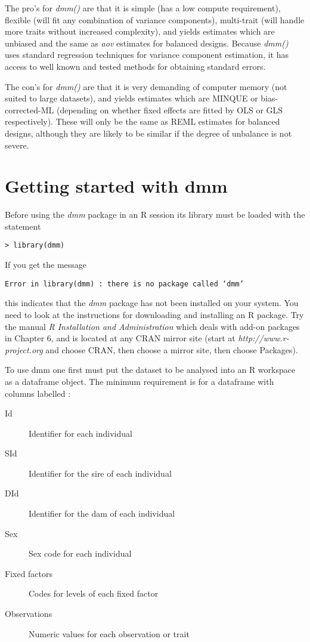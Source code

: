 \documentclass[titlepage]{article}  %
\begin{document}
The pro's for {\em dmm()} are that it is simple (has a low compute requirement), flexible (will fit any combination of variance components), multi-trait (will handle more traits without increased complexity), and yields estimates which are unbiased and the same as {\em aov} estimates for balanced designs.  Because {\em dmm()} uses standard regression techniques for variance component estimation, it has access to well known and tested methods for obtaining standard errors.

The con's for {\em dmm()} are that it is very demanding of computer memory (not suited to large datasets), and yields estimates which are MINQUE or bias-corrected-ML (depending on whether fixed effects are fitted by OLS or GLS respectively). These will only be the same as REML estimates for balanced designs, although they are likely to be similar if the degree of unbalance is not  severe.
 
\clearpage
\section{Getting started with dmm}
 Before using the {\em dmm} package in an R session its library must be loaded with the statement

\begin{verbatim}
> library(dmm)
\end{verbatim}

If you get the message
\begin{verbatim}
Error in library(dmm) : there is no package called ‘dmm’
\end{verbatim}

this indicates that the {\em dmm} package has not been installed on your system. You need to look at the instructions for downloading and installing an R package.  Try the manual {\em R Installation and Administration} which deals with add-on packages in Chapter 6, and is located at any CRAN mirror site (start at {\em http://www.r-project.org} and choose CRAN, then choose a mirror site, then choose Packages).

 To use dmm one first must put the dataset to be analysed into an R workspace as a dataframe object. The minimum requirement is for a dataframe with columns labelled :
\begin{description}
\item[Id] Identifier for each individual
\item[SId] Identifier for the sire of each individual
\item[DId] Identifier for the dam of each individual
\item[Sex] Sex code for each individual
\item[Fixed factors] Codes for levels of each fixed factor
\item[Observations] Numeric values for each observation or trait
\end{description}
\end{document}
